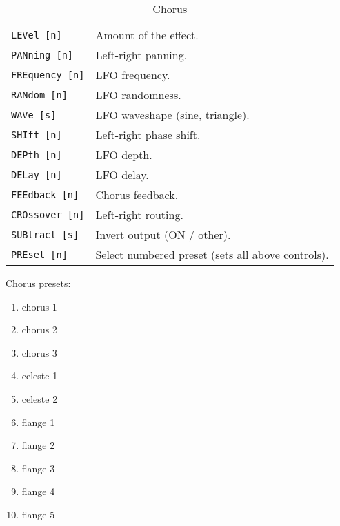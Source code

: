    \begin{table}[H]
      \centering
      \caption{Chorus}
      \begin{tabular}{l l}
\texttt{LEVel [n]} &
   Amount of the effect. \\
\texttt{PANning [n]} &
   Left-right panning. \\
\texttt{FREquency [n]} &
   LFO frequency. \\
\texttt{RANdom [n]} &
   LFO randomness. \\
\texttt{WAVe [s]} &
   LFO waveshape (sine, triangle). \\
\texttt{SHIft [n]} &
   Left-right phase shift. \\
\texttt{DEPth [n]} &
   LFO depth. \\
\texttt{DELay [n]} &
   LFO delay. \\
\texttt{FEEdback [n]} &
   Chorus feedback. \\
\texttt{CROssover [n]} &
   Left-right routing. \\
\texttt{SUBtract [s]} &
   Invert output (ON / other). \\
\texttt{PREset [n]} &
   Select numbered preset (sets all above controls). \\
      \end{tabular}
   \end{table}
Chorus presets:
   \begin{enumerate}
      \item chorus 1
      \item chorus 2
      \item chorus 3
      \item celeste 1
      \item celeste 2
      \item flange 1
      \item flange 2
      \item flange 3
      \item flange 4
      \item flange 5
   \end{enumerate}

